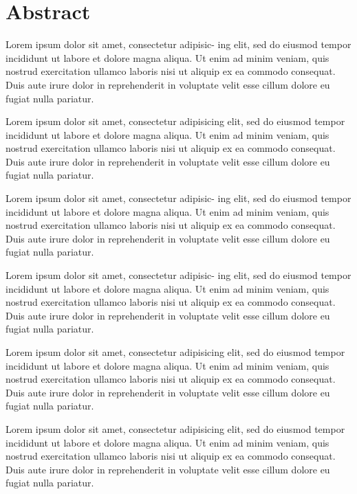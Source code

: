 \chapter*{Abstract}\label{chapter:abstract}
 Lorem ipsum dolor sit amet, consectetur adipisic-
ing elit, sed do eiusmod tempor incididunt ut labore et dolore magna aliqua. Ut enim ad
minim veniam, quis nostrud exercitation ullamco laboris nisi ut aliquip ex ea commodo
consequat. Duis aute irure dolor in reprehenderit in voluptate velit esse cillum dolore eu
fugiat nulla pariatur.


 Lorem ipsum dolor sit amet, consectetur
adipisicing elit, sed do eiusmod tempor incididunt ut labore et dolore magna aliqua.
Ut enim ad minim veniam, quis nostrud exercitation ullamco laboris nisi ut aliquip ex
ea commodo consequat. Duis aute irure dolor in reprehenderit in voluptate velit esse
cillum dolore eu fugiat nulla pariatur.


 Lorem ipsum dolor sit amet, consectetur adipisic-
ing elit, sed do eiusmod tempor incididunt ut labore et dolore magna aliqua. Ut enim ad
minim veniam, quis nostrud exercitation ullamco laboris nisi ut aliquip ex ea commodo
consequat. Duis aute irure dolor in reprehenderit in voluptate velit esse cillum dolore eu
fugiat nulla pariatur.


 Lorem ipsum dolor sit amet, consectetur adipisic-
ing elit, sed do eiusmod tempor incididunt ut labore et dolore magna aliqua. Ut enim ad
minim veniam, quis nostrud exercitation ullamco laboris nisi ut aliquip ex ea commodo
consequat. Duis aute irure dolor in reprehenderit in voluptate velit esse cillum dolore eu
fugiat nulla pariatur.


 Lorem ipsum dolor sit amet, consectetur
adipisicing elit, sed do eiusmod tempor incididunt ut labore et dolore magna aliqua.
Ut enim ad minim veniam, quis nostrud exercitation ullamco laboris nisi ut aliquip ex
ea commodo consequat. Duis aute irure dolor in reprehenderit in voluptate velit esse
cillum dolore eu fugiat nulla pariatur.


 Lorem ipsum dolor sit amet, consectetur
adipisicing elit, sed do eiusmod tempor incididunt ut labore et dolore magna aliqua.
Ut enim ad minim veniam, quis nostrud exercitation ullamco laboris nisi ut aliquip ex
ea commodo consequat. Duis aute irure dolor in reprehenderit in voluptate velit esse
cillum dolore eu fugiat nulla pariatur.

\doit
